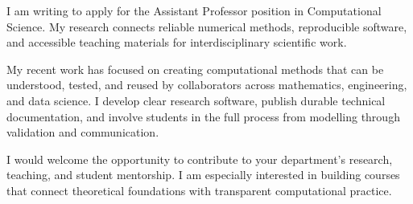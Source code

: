 \documentclass[family=academic]{careerdossier-letter}
\begin{document}
\MakeCDossierLetterhead

I am writing to apply for the Assistant Professor position in Computational
Science. My research connects reliable numerical methods, reproducible software,
and accessible teaching materials for interdisciplinary scientific work.

My recent work has focused on creating computational methods that can be
understood, tested, and reused by collaborators across mathematics, engineering,
and data science. I develop clear research software, publish durable technical
documentation, and involve students in the full process from modelling through
validation and communication.

I would welcome the opportunity to contribute to your department's research,
teaching, and student mentorship. I am especially interested in building courses
that connect theoretical foundations with transparent computational practice.

\MakeCDossierClosing
\end{document}
